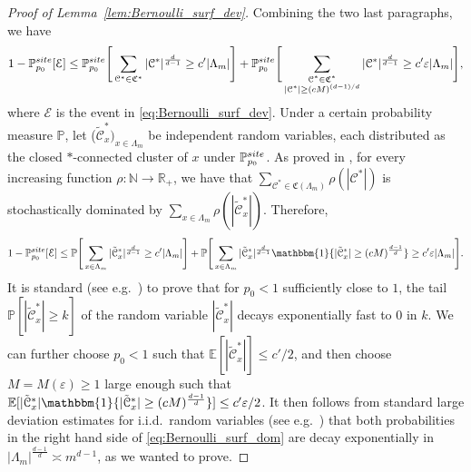 \documentclass[11pt,a4paper]{article}
\theoremstyle{definition}
\numberwithin{equation}{section}
\newcommand\R{\mathbb{R}}
\newcommand\N{\mathbb{N}}
\begin{document}
\begin{proof}[Proof of Lemma~\textup{\ref{lem:Bernoulli_surf_dev}}]
Combining the two last paragraphs, we have
\begin{equation}
    1-\mathbb{P}^{\textup{site}}_{p_0}[\mathcal{E}]\leq  \mathbb{P}^{\textup{site}}_{p_0} \Bigg[ \sum_{\mathcal{C}^*\in \mathfrak{C}^*} |\mathcal{C}^*|^{\frac{d}{d-1}} \geq c' |\Lambda_m| \Bigg]  + \mathbb{P}^{\textup{site}}_{p_0} \Bigg[ \sum_{\substack{ \mathcal{C}^*\in \mathfrak{C}^*\\ |\mathcal{C}^*|\geq (cM)^{{(d-1)}/{d}} }} |\mathcal{C}^*|^{\frac{d}{d-1}} \geq c'\varepsilon |\Lambda_m| \Bigg],
\end{equation}
where $\mathcal{E}$ is the event in \eqref{eq:Bernoulli_surf_dev}.
Under a certain probability measure $\mathbb{P}$, let ($\tilde{\mathcal{C}}^*_x)_{x\in \Lambda_m}$ be independent random variables, each distributed as the closed $*$-connected cluster of $x$ under $\mathbb{P}^{\textup{site}}_{p_0}$.
As proved in \cite[Lemma 2.3]{DP96}, for every increasing function $\rho:\N\to \R_+$, we have that $\sum_{\mathcal{C}^* \in\mathfrak{C}(\Lambda_m)} \rho(|\mathcal{C}^*|)$ is stochastically dominated by $\sum_{x\in\Lambda_m} \rho(|\tilde{\mathcal{C}}^*_x|)$.
Therefore,
\begin{equation}\label{eq:Bernoulli_surf_dom}
    1-\mathbb{P}^{\textup{site}}_{p_0}[\mathcal{E}]\leq  
    \mathbb{P} \Bigg[ \sum_{x\in\Lambda_m} |\tilde{\mathcal{C}}^*_x|^{\frac{d}{d-1}} \geq c' |\Lambda_m| \Bigg]  + \mathbb{P} \Bigg[ \sum_{x\in\Lambda_m } |\tilde{\mathcal{C}}^*_x|^{\frac{d}{d-1}} \mathbbm{1}\{|\tilde{\mathcal{C}}^*_x|\geq (c M)^{\frac{d-1}{d}}\} \geq c'\varepsilon |\Lambda_m| \Bigg].
\end{equation}
It is standard (see e.g.~\cite[Equation (3.8)]{DP96}) to prove that for $p_0<1$ sufficiently close to $1$, the tail $\mathbb{P}[|\tilde{\mathcal{C}}^*_x|\geq k]$ of the random variable $|\tilde{\mathcal{C}}^*_x|$ decays exponentially fast to $0$ in $k$. We can further choose $p_0<1$ such that $\mathbb{E}[|\tilde{\mathcal{C}}^*_x|]\leq c'/2$, and then choose $M=M(\varepsilon)\geq 1$ large enough such that $\mathbb{E}[|\tilde{\mathcal{C}}^*_x| \mathbbm{1}\{|\tilde{\mathcal{C}}^*_x|\geq (c M)^{\frac{d-1}{d}}\}]\leq c'\varepsilon/2$. It then follows from standard large deviation estimates for i.i.d.~random variables (see e.g.~\cite{durrett2019probability}) that both probabilities in the right hand side of \eqref{eq:Bernoulli_surf_dom} are decay exponentially in $|\Lambda_m|^{\frac{d-1}{d}} \asymp m^{d-1}$, as we wanted to prove.
\end{proof}
\end{document}
